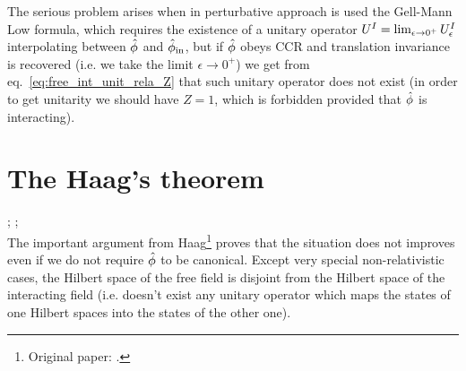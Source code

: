\documentclass[../main/main.tex]{subfiles}
\begin{document}
The serious problem arises when in perturbative approach is used the Gell-Mann Low formula, which requires the existence of a unitary operator $U^I=\lim_{\epsilon\to0^+}\uei$ interpolating between $\hat{\phi}$ and $\hat{\phi}_{\textnormal{in}}$, but if $\hat{\phi}$ obeys CCR and translation invariance is recovered (i.e. we take the limit $\epsilon\to0^+$) we get from eq.~\eqref{eq:free_int_unit_rela_Z}  that such unitary operator does not exist (in order to get unitarity we should have $Z=1$, which is forbidden provided that $\hat{\phi}$ is interacting).

\section{The Haag's theorem}

\cite[Section 3]{Earman:2005}; \cite[Section 4.5]{Streater:2000}; \cite[Pages 39-40, 95-96]{Strocchi_2013}\\

The important argument from Haag\footnote{Original paper: \cite{Haag:1955}.} proves that the situation does not improves even if we do not require $\hat{\phi}$ to be canonical. Except very special non-relativistic cases, the Hilbert space of the free field is disjoint from the Hilbert space of the interacting field (i.e. doesn't exist any unitary operator which maps the states of one Hilbert spaces into the states of the other one). 
\end{document}
